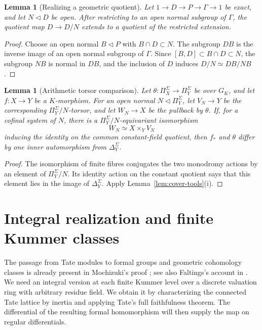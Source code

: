 \documentclass[11pt,a4paper]{article}
\numberwithin{equation}{section}
\theoremstyle{plain}
\newtheorem{lemma}[theorem]{Lemma}
\theoremstyle{definition}
\theoremstyle{remark}
\renewcommand{\S}{\ensuremath{\mathsection}}
\begin{document}
\begin{lemma}[Realizing a geometric quotient]
\label{lem:quotient-descent}
Let $1\to D\to P\to\Gamma\to1$ be exact, and let $N\triangleleft D$
be open. After restricting to an open normal subgroup of $\Gamma$, the
quotient map $D\to D/N$ extends to a quotient of the restricted extension.
\end{lemma}
\begin{proof}
Choose an open normal $B\triangleleft P$ with $B\cap D\subset N$.
The subgroup $DB$ is the inverse image of an open normal subgroup of
$\Gamma$. Since $[B,D]\subset B\cap D\subset N$, the subgroup $NB$ is
normal in $DB$, and the inclusion of $D$ induces
$D/N\simeq DB/NB$.
\end{proof}

\begin{lemma}[Arithmetic torsor comparison]
\label{lem:torsor-comparison}
Let $\theta:\Pi_X^\Sigma\to\Pi_Y^\Sigma$ be over $G_K$, and let
$f:X\to Y$ be a $K$-morphism. For an open normal $N\triangleleft\Pi_Y^\Sigma$,
let $V_N\to Y$ be the corresponding $\Pi_Y^\Sigma/N$-torsor, and let
$W_N\to X$ be the pullback by $\theta$. If, for a cofinal system of $N$,
there is a $\Pi_Y^\Sigma/N$-equivariant isomorphism
\[
 W_N\simeq X\times_YV_N
\]
inducing the identity on the common constant-field quotient, then $f_*$ and
$\theta$ differ by one inner automorphism from $\Delta_Y^\Sigma$.
\end{lemma}
\begin{proof}
The isomorphism of finite fibres conjugates the two monodromy actions by an
element of $\Pi_Y^\Sigma/N$. Its identity action on the constant quotient says
that this element lies in the image of $\Delta_Y^\Sigma$. Apply
Lemma~\ref{lem:cover-tools}(i). 
\end{proof}

\section{Integral realization and finite Kummer classes}
\label{sec:local}
\label{sec:local-package}

The passage from Tate modules to formal groups and geometric cohomology
classes is already present in Mochizuki's proof
\cite[\S6 and the proof of Proposition~7.4]{Mochizuki1999}; see also
Faltings's account in \cite[Proposition~11]{Faltings1998}.  We need an
integral version at each finite Kummer level over a discrete valuation
ring with arbitrary residue field.  We obtain it by characterizing the
connected Tate lattice by inertia and applying Tate's full faithfulness
theorem.  The differential of the resulting formal homomorphism will
then supply the map on regular differentials.
\end{document}

